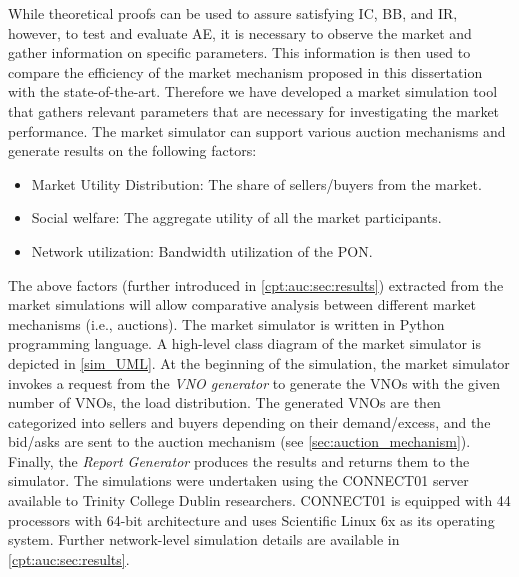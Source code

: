While theoretical proofs can be used to assure satisfying \ac{IC}, \ac{BB}, and \ac{IR}, however, to test and evaluate \acl{AE}, it is necessary to observe the market and gather information on specific parameters. This information is then used to compare the efficiency of the market mechanism proposed in this dissertation with the state-of-the-art.
Therefore we have developed a market simulation tool that gathers relevant parameters that are necessary for investigating the market performance. The market simulator can support various auction mechanisms and generate results on the following factors:
\begin{itemize}
    \item Market Utility Distribution: The share of sellers/buyers from the market.
    \item Social welfare: The aggregate utility of all the market participants.
    \item Network utilization: Bandwidth utilization of the \ac{PON}.
\end{itemize}

The above factors (further introduced in \autoref{cpt:auc:sec:results}) extracted from the market simulations will allow comparative analysis between different market mechanisms (i.e., auctions). The market simulator is written in Python \cite{van1995python} programming language. A high-level class diagram of the market simulator is depicted in \autoref{sim_UML}. At the beginning of the simulation, the market simulator invokes a request from the \textit{\ac{VNO} generator} to generate the \acp{VNO} with the given number of \acp{VNO}, the load distribution. The generated \acp{VNO} are then categorized into sellers and buyers depending on their demand/excess, and the bid/asks are sent to the auction mechanism (see \autoref{sec:auction_mechanism}). Finally, the \textit{Report Generator} produces the results and returns them to the simulator. The simulations were undertaken using the CONNECT01 server available to Trinity College Dublin researchers. CONNECT01 is equipped with 44 processors with 64-bit architecture and uses Scientific Linux 6x \cite{scientific_linux} as its operating system. Further network-level simulation details are available in \autoref{cpt:auc:sec:results}.

